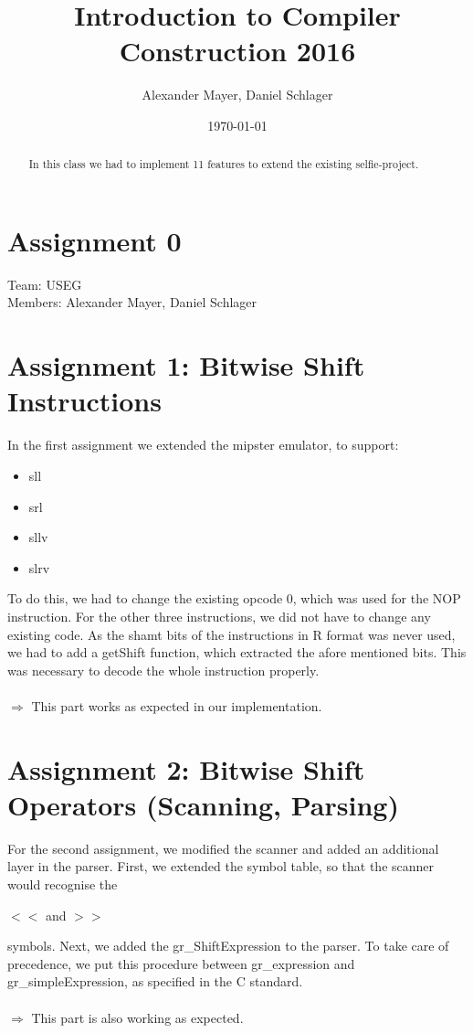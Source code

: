 \documentclass[a4paper,12pt]{article}
\begin{document}
\title{Introduction to Compiler Construction 2016}
\author{Alexander Mayer, Daniel Schlager}
\date{\today}
\maketitle

\begin{abstract}
In this class we had to implement 11 features to extend the existing selfie-project\cite{cksystemsteaching}.
\end{abstract}

\newpage
\tableofcontents
\newpage

\section{Assignment 0}
Team: USEG\\
Members: Alexander Mayer, Daniel Schlager

\section{Assignment 1: Bitwise Shift Instructions}
In the first assignment we extended the mipster emulator, to support:
\begin{itemize}
\item sll
\item srl
\item sllv
\item slrv 
\end{itemize}
To do this, we had to change the existing opcode 0, which was used for the NOP instruction\cite{mips}. For the other three instructions, we did not have to change any existing code. As the shamt bits of the instructions in R format\cite{mips} was never used, we had to add a getShift function, which extracted the afore mentioned bits. This was necessary to decode the whole instruction properly.\\\\
$\Rightarrow$ This part works as expected in our implementation.

\section{Assignment 2: Bitwise Shift Operators (Scanning, Parsing)}
For the second assignment, we modified the scanner and added an additional layer in the parser. First, we extended the symbol table, so that the scanner would recognise the 
\begin{center}$<<$ and $>>$\end{center}
symbols. Next, we added the gr\_ShiftExpression to the parser. To take care of precedence, we put this procedure between gr\_expression and gr\_simpleExpression, as specified in the C standard\cite{cs50}.\\\\
$\Rightarrow$ This part is also working as expected.
\end{document}
